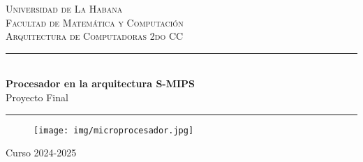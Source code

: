 \documentclass[12pt]{amsart}
\begin{document}
	\newcommand{\Efecto}[2]{Efectos de la instrucción:
		
		\medskip
		\begin{itemize}
			{#1}
		\end{itemize}
		\medskip
		Ensamblador:
		
		\medskip
		\texttt{\qquad\ #2}}
	
	\newcommand{\pto}{\item[]}
	
	\newcommand{\Rs}{$R_s$}
	\newcommand{\Rt}{$R_t$}
	\newcommand{\Rd}{$R_d$}
	\newcommand{\nop}{$PC \alloc [PC] + 4$}
	
	\newcommand{\ReadTime}{\texttt{Read Time}}
	\newcommand{\RT}{\texttt{RT}}
	\newcommand{\WriteTime}{\texttt{Write Time}}
	\newcommand{\WT}{\texttt{WT}}
	\newcommand{\ADDR}{\texttt{ADDR}}
	\newcommand{\MASK}{\texttt{MASK}}
	\newcommand{\ChipSelect}{\texttt{Chip Select}}
	\newcommand{\CS}{\texttt{CS}}
	
	\thispagestyle{empty}
	\newcommand{\HRule}{\rule{\linewidth}{0.5mm}}
	\hspace{1cm}
	\vspace{1cm}
	\begin{center}
	\textsc{\huge Universidad de La Habana}\\[2.0cm]
	\textsc{\Large Facultad de Matemática y Computación}\\[1.0cm]
	\textsc{\Large Arquitectura de Computadoras 2do CC}\\[1.0cm]
	
	\HRule\\[1.4cm]
	{ \huge \bfseries Procesador en la arquitectura S-MIPS}\\\vspace{0.2cm}
	{ \large Proyecto Final}\\\vspace{0.3cm} %
	\HRule
	\vspace{1cm}
	\begin{figure}[H]
		\texttt{[image: img/microprocesador.jpg]}
	\end{figure}

	\vspace{85px}
	Curso 2024-2025

	

	\end{center}
	
	\vspace{2.9cm}
	
\end{document}
